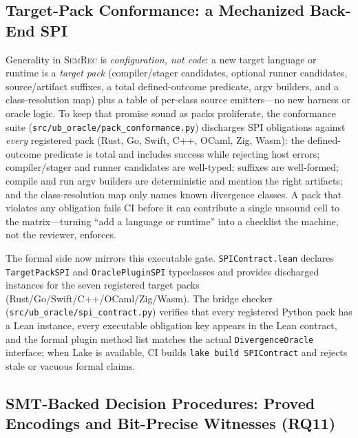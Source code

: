 \documentclass[10pt,a4paper]{article}
\begin{document}
\subsection{Target-Pack Conformance: a Mechanized Back-End
SPI}\label{sec:eval-conformance}

Generality in \textsc{SemRec} is \emph{configuration, not code}: a new target
language or runtime is a \emph{target pack} (compiler/stager candidates, optional
runner candidates, source/artifact suffixes, a total defined-outcome predicate,
argv builders, and a class-resolution map) plus a table of per-class source
emitters---no new harness or oracle logic. To keep that promise sound as packs
proliferate, the conformance suite
(\texttt{src/ub\_oracle/pack\_conformance.py}) discharges SPI obligations
against \emph{every} registered pack (Rust, Go, Swift, C++, OCaml, Zig, Wasm):
the defined-outcome predicate is total and includes success while rejecting host
errors; compiler/stager and runner candidates are well-typed; suffixes are
well-formed; compile and run argv builders are deterministic and mention the
right artifacts; and the class-resolution map only names known divergence
classes. A pack that violates any obligation fails CI before it can contribute a
single unsound cell to the matrix---turning ``add a language or runtime'' into a
checklist the machine, not the reviewer, enforces.

The formal side now mirrors this executable gate.  \texttt{SPIContract.lean}
declares \texttt{TargetPackSPI} and \texttt{OraclePluginSPI} typeclasses and
provides discharged instances for the seven registered target packs
(Rust/Go/Swift/C++/OCaml/Zig/Wasm).  The bridge checker
(\texttt{src/ub\_oracle/spi\_contract.py}) verifies that every registered Python
pack has a Lean instance, every executable obligation key appears in the Lean
contract, and the formal plugin method list matches the actual
\texttt{DivergenceOracle} interface; when Lake is available, CI builds
\texttt{lake build SPIContract} and rejects stale or vacuous formal claims.

\subsection{SMT-Backed Decision Procedures: Proved Encodings and Bit-Precise
Witnesses (RQ11)}\label{sec:eval-smt}
\end{document}
